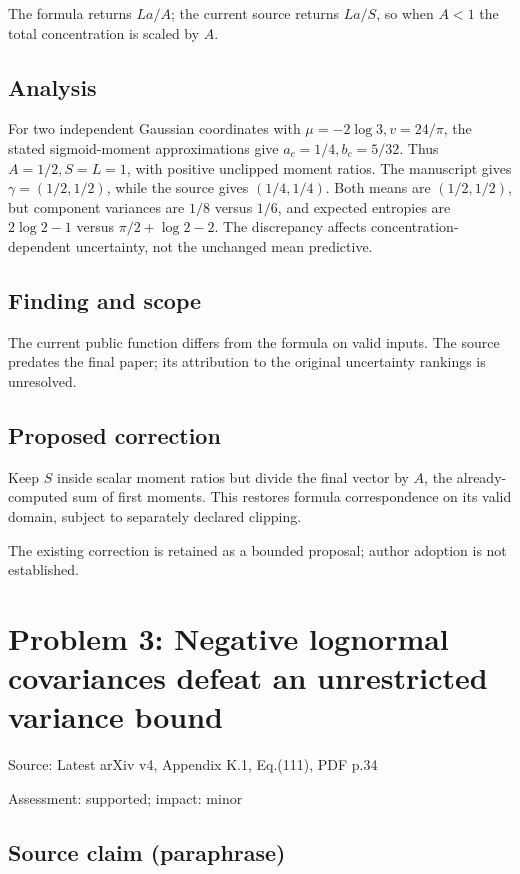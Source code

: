 \documentclass[11pt]{article}
\begin{document}
The formula returns \(La/A\); the current source returns \(La/S\), so when \(A<1\) the total concentration is scaled by \(A\).

\subsection*{Analysis}

For two independent Gaussian coordinates with \(\mu=-2\log3,v=24/\pi\), the stated sigmoid-moment approximations give \(a_c=1/4,b_c=5/32\). Thus \(A=1/2,S=L=1\), with positive unclipped moment ratios. The manuscript gives \(\gamma=(1/2,1/2)\), while the source gives \((1/4,1/4)\). Both means are \((1/2,1/2)\), but component variances are \(1/8\) versus \(1/6\), and expected entropies are \(2\log2-1\) versus \(\pi/2+\log2-2\). The discrepancy affects concentration-dependent uncertainty, not the unchanged mean predictive.

\subsection*{Finding and scope}

The current public function differs from the formula on valid inputs. The source predates the final paper; its attribution to the original uncertainty rankings is unresolved.

\subsection*{Proposed correction}

Keep \(S\) inside scalar moment ratios but divide the final vector by \(A\), the already-computed sum of first moments. This restores formula correspondence on its valid domain, subject to separately declared clipping.

The existing correction is retained as a bounded proposal; author adoption is not established.

\section*{Problem 3: Negative lognormal covariances defeat an unrestricted variance bound}

Source: Latest arXiv v4, Appendix K.1, Eq.(111), PDF p.34

Assessment: supported; impact: minor

\subsection*{Source claim (paraphrase)}
\end{document}
